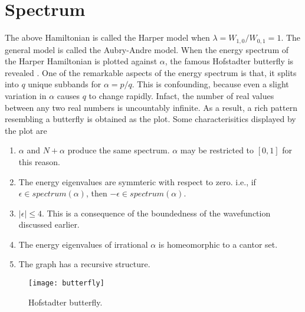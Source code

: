\section{Spectrum} The above Hamiltonian is called the Harper model when $\lambda = W_{1,0}/W_{0,1} = 1$. The general model is called the Aubry-Andre model.
When the energy spectrum of the Harper Hamiltonian is plotted against $\alpha$, the famous Hofstadter butterfly is revealed \cite{hofstadter1976energy}. One of the remarkable aspects
of the energy spectrum is that, it splits into $q$ unique subbands for $\alpha=p/q$. This is confounding, because even a slight variation in $\alpha$ causes $q$ to change rapidly.
Infact, the number of real values between any two real numbers is uncountably infinite. As a result, a rich pattern resembling a butterfly is obtained as the plot. Some characterisitics 
displayed by the plot are \cite{hofstadter1976energy,satija2016butterfly,azbel1964energy,macdonald1983landau}
\begin{enumerate}
 \item $\alpha$ and $N+\alpha$ produce the same spectrum. $\alpha$ may be restricted to $[0,1]$ for this reason.
 \item The energy eigenvalues are symmteric with respect to zero. i.e., if $\epsilon \in spectrum(\alpha)$, then $-\epsilon \in spectrum(\alpha)$.
 \item $|\epsilon| \leq 4$. This is a consequence of the boundedness of the wavefunction discussed earlier.
 \item The energy eigenvalues of irrational $\alpha$ is homeomorphic to a cantor set.
 \item The graph has a recursive structure.
\end{enumerate}

\begin{figure}[h]
 \caption{Hofstadter butterfly.}
 \texttt{[image: butterfly]}
 \centering
\end{figure}

